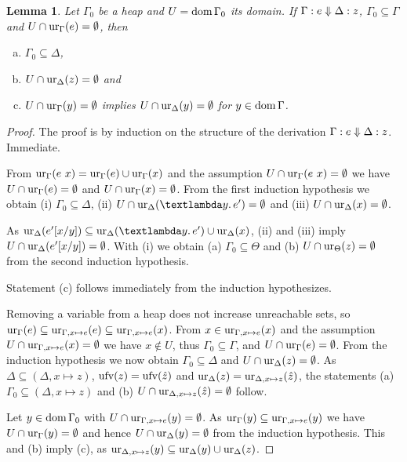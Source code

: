 \documentclass[preprint]{sigplanconf}
\newtheorem{lemma}[theorem]{Lemma}
\theoremstyle{nonumberplain}
\newtheorem{proof}{Proof}
\begin{document}
\begin{lemma}
\label{lem:deepdup}
Let $\Gamma_0$ be a heap and $U= \text{dom}\,\Gamma_0$ its domain. If $\Gamma : e \Downarrow \Delta : z$, $\Gamma_0 \subseteq \Gamma$ and $U \cap \text{ur}_{\Gamma}(e) = \emptyset$, then
\begin{enumerate}[(a)]
\item $\Gamma_0 \subseteq \Delta$,
\item $U \cap \text{ur}_{\Delta}(z)=\emptyset$ and
\item \label{lem:deepdup:3} $U \cap \text{ur}_{\Gamma}(y) = \emptyset$ implies $U\cap \text{ur}_{\Delta}(y) = \emptyset$ for $y\in \text{dom}\,\Gamma$.
\end{enumerate}
\end{lemma}

\begin{proof} 
The proof is by induction on the structure of the derivation $\Gamma : e \Downarrow \Delta : z$.
Immediate.

From $\text{ur}_{\Gamma}(e\ x) = \text{ur}_{\Gamma}(e) \cup \text{ur}_{\Gamma}(x)$ and the assumption $U \cap \text{ur}_{\Gamma}(e\ x)= \emptyset$ we have $U \cap \text{ur}_{\Gamma}(e) = \emptyset$ and $U \cap \text{ur}_{\Gamma}(x) = \emptyset$. From the first induction hypothesis we obtain (i) $\Gamma_0 \subseteq \Delta$, (ii) $U \cap \ur\Delta {\sLam y e'}= \emptyset$ and (iii) $U \cap \text{ur}_{\Delta}(x) = \emptyset$.

As $\ur\Delta{e'[x/y]} \subseteq \ur\Delta{\sLam ye'} \cup \ur\Delta{x}$, (ii) and (iii) imply $U \cap \text{ur}_{\Delta}(e'[x/y]) = \emptyset$. With (i) we obtain (a) $\Gamma_0\subseteq\Theta$ and (b) $U\cap \text{ur}_{\Theta}(z) = \emptyset$ from the second induction hypothesis.

Statement (c) follows immediately from the induction hypothesizes.

Removing a variable from a heap does not increase unreachable sets, so $\text{ur}_{\Gamma}(e) \subseteq \text{ur}_{\Gamma, x\mapsto e}(e) \subseteq \text{ur}_{\Gamma,x\mapsto e}(x)$. From $x \in \text{ur}_{\Gamma,x \mapsto e}(x)$ and the assumption $U \cap \text{ur}_{\Gamma,x\mapsto e}(x) = \emptyset$ we have $x \notin U$, thus $\Gamma_0 \subseteq \Gamma$, and $U \cap \text{ur}_{\Gamma}(e) = \emptyset$. From the induction hypothesis we now obtain $\Gamma_0 \subseteq \Delta$ and $U \cap \text{ur}_{\Delta}(z) = \emptyset$. As $\Delta \subseteq (\Delta, x \mapsto z)$, $\text{ufv}(z) = \text{ufv}(\hat z)$ and $\text{ur}_{\Delta}(z) = \text{ur}_{\Delta, x \mapsto z}(\hat z)$, the statements (a) $\Gamma_0\subseteq(\Delta,x\mapsto z)$ and (b) $ U\cap \text{ur}_{\Delta, x\mapsto z}(\hat z) = \emptyset$ follow.

Let $y\in \text{dom}\,\Gamma_0$ with $U\cap \text{ur}_{\Gamma,x\mapsto e}(y)=\emptyset$. As $\text{ur}_{\Gamma}(y) \subseteq \text{ur}_{\Gamma,x\mapsto e}(y)$ we have $U\cap\text{ur}_{\Gamma}(y)=\emptyset$ and hence $U\cap\text{ur}_{\Delta}(y)=\emptyset$ from the induction hypothesis. This and (b) imply (c), as $\text{ur}_{\Delta,x\mapsto z}(y) \subseteq \text{ur}_{\Delta}(y) \cup \text{ur}_{\Delta}(z)$.


\end{proof}
\end{document}
